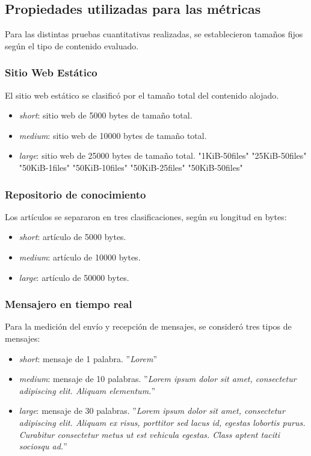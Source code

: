 \subsection{Propiedades utilizadas para las métricas}

Para las distintas pruebas cuantitativas realizadas, se establecieron tamaños fijos según el tipo de contenido evaluado.

\subsubsection{Sitio Web Estático}

El sitio web estático se clasificó por el tamaño total del contenido alojado.

\begin{itemize}
    \item \textit{short}: sitio web de 5000 bytes de tamaño total.
    \item \textit{medium}: sitio web de 10000 bytes de tamaño total.
    \item \textit{large}: sitio web de 25000 bytes de tamaño total.
      "1KiB-50files"
  "25KiB-50files"
  "50KiB-1files"
  "50KiB-10files"
  "50KiB-25files"
  "50KiB-50files"

    
    \end{itemize}

\subsubsection{Repositorio de conocimiento}

Los artículos se separaron en tres clasificaciones, según su longitud en bytes:

\begin{itemize}
    \item \textit{short}: artículo de 5000 bytes.
    \item \textit{medium}: artículo de 10000 bytes.
    \item \textit{large}: artículo de 50000 bytes.
\end{itemize}

\subsubsection{Mensajero en tiempo real}

Para la medición del envío y recepción de mensajes, se consideró tres tipos de mensajes:

\begin{itemize}
    \item \textit{short}: mensaje de 1 palabra. ''\textit{Lorem}''
    \item \textit{medium}: mensaje de 10 palabras. ''\textit{Lorem ipsum dolor sit amet, consectetur adipiscing elit. Aliquam elementum.}''
    \item \textit{large}: mensaje de 30 palabras. ''\textit{Lorem ipsum dolor sit amet, consectetur adipiscing elit. Aliquam ex risus, porttitor sed lacus id, egestas lobortis purus. Curabitur consectetur metus ut est vehicula egestas. Class aptent taciti sociosqu ad.}''
\end{itemize}

